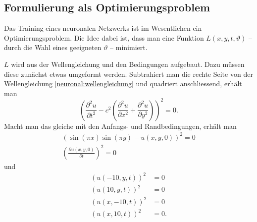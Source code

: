 \subsection{Formulierung als Optimierungsproblem}\label{neuronal:subsection:optimierungsproblem}
Das Training eines neuronalen Netzwerks ist im Wesentlichen ein Optimierungsproblem.
Die Idee dabei ist, dass man eine Funktion \( L(x, y, t, \vartheta) \) -- durch die Wahl eines geeigneten \( \vartheta \) -- minimiert.

\( L \) wird aus der Wellengleichung und den Bedingungen aufgebaut. Dazu müssen diese zunächst etwas umgeformt werden.
Subtrahiert man die rechte Seite von der Wellengleichung \eqref{neuronal:wellengleichung} und quadriert anschliessend, erhält man
\begin{equation}
    \left(\frac{\partial^2 u}{\partial t^2} - c^2 \left( \frac{\partial^2 u}{\partial x^2} + \frac{\partial^2 u}{\partial y^2} \right)\right)^2 = 0.
    \label{neuronal:wellengleichung_umformuliert}
\end{equation}
Macht man das gleiche mit den Anfangs- und Randbedingungen, erhält man
\begin{equation}
    \begin{aligned}
        \left(\sin(\pi x) \sin(\pi y) - u(x, y, 0)\right)^2 = 0\\
        \left(\frac{\partial u(x, y, 0)}{\partial t}\right)^2 = 0
    \end{aligned}
    \label{neuronal:anfangsbedingung_umformuliert}
\end{equation}
und
\begin{equation}
    \begin{aligned}
        \left(u(-10, y, t)\right)^2 &= 0\\
        \left(u(10, y, t)\right)^2 &= 0\\
        \left(u(x, -10, t)\right)^2 &= 0\\
        \left(u(x, 10, t)\right)^2 &= 0.
    \end{aligned}
    \label{neuronal:randbedingung_umformuliert}
\end{equation}

